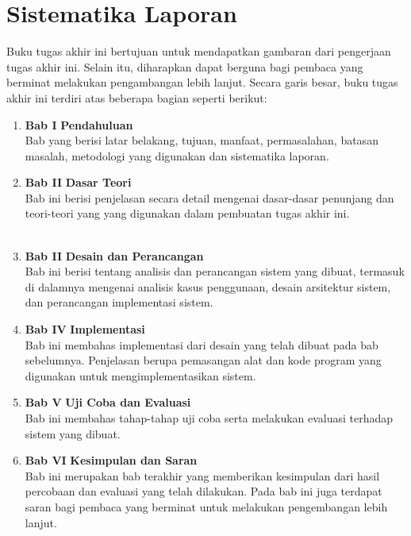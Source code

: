 \section{Sistematika Laporan}
Buku tugas akhir ini bertujuan untuk mendapatkan gambaran dari pengerjaan tugas akhir ini. Selain itu, diharapkan dapat berguna bagi pembaca yang berminat melakukan pengambangan lebih lanjut. Secara garis besar, buku tugas akhir ini terdiri atas beberapa bagian seperti berikut:
\begin{enumerate}

\item \textbf{Bab I} \indent \textbf{Pendahuluan} \\        
\indent \indent Bab yang berisi latar belakang, tujuan, manfaat, permasalahan, batasan masalah, metodologi yang digunakan dan sistematika laporan.
\\
\item \textbf{Bab II} \indent \textbf{Dasar Teori}
\\
\indent \indent Bab ini berisi penjelasan secara detail mengenai dasar-dasar penunjang dan teori-teori yang yang digunakan dalam pembuatan tugas akhir ini.
\\\\
\item \textbf{Bab II} \indent \textbf{Desain dan Perancangan}
\\
\indent \indent Bab ini berisi tentang analisis dan perancangan sistem yang dibuat, termasuk di dalamnya mengenai analisis kasus penggunaan, desain arsitektur sistem, dan perancangan implementasi sistem.
\\
\item \textbf{Bab IV} \indent \textbf{Implementasi}
\\
\indent \indent Bab ini membahas implementasi dari desain yang telah dibuat pada bab sebelumnya. Penjelasan berupa pemasangan alat dan kode program yang digunakan untuk mengimplementasikan sistem.
\\
\item \textbf{Bab V} \indent \textbf{Uji Coba dan Evaluasi}
\\
\indent \indent Bab ini membahas tahap-tahap uji coba serta melakukan evaluasi terhadap sistem yang dibuat.
\\
\item \textbf{Bab VI} \indent \textbf{Kesimpulan dan Saran}
\\
\indent \indent Bab ini merupakan bab terakhir yang memberikan kesimpulan dari hasil percobaan dan evaluasi yang telah dilakukan. Pada bab ini juga terdapat saran bagi pembaca yang berminat untuk melakukan pengembangan lebih lanjut.    
\end{enumerate}